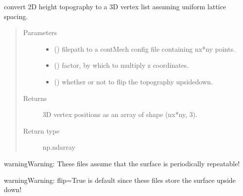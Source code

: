 \documentclass[letterpaper,10pt,english]{sphinxmanual}
\begin{document}

\begin{fulllineitems}
\label{\detokenize{stlutils:stlutils.from_file}}
\sphinxAtStartPar
convert 2D height topography to a 3D vertex list assuming uniform lattice spacing.
\begin{quote}\begin{description}
\item[{Parameters}] \leavevmode\begin{itemize}
\item {} 
\sphinxAtStartPar
{} () \textendash{} filepath to a contMech config file containing nx*ny points.

\item {} 
\sphinxAtStartPar
{} () \textendash{} factor, by which to multiply z coordinates.

\item {} 
\sphinxAtStartPar
{} () \textendash{} whether or not to flip the topography upside\sphinxhyphen{}down.

\end{itemize}

\item[{Returns}] \leavevmode
\sphinxAtStartPar
3D vertex positions as an array of shape (nx*ny, 3).

\item[{Return type}] \leavevmode
\sphinxAtStartPar
np.ndarray

\end{description}\end{quote}

\begin{sphinxadmonition}{warning}{Warning:}
\sphinxAtStartPar
These files assume that the surface is periodically repeatable!
\end{sphinxadmonition}

\begin{sphinxadmonition}{warning}{Warning:}
\sphinxAtStartPar
flip=True is default since these files store the surface upside down!
\end{sphinxadmonition}

\end{fulllineitems}
\end{document}
